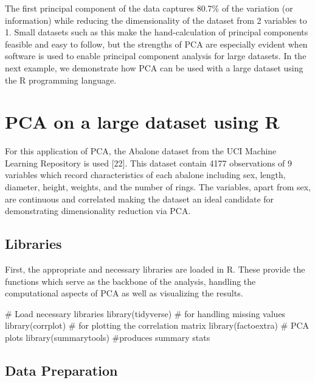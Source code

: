\documentclass[
  letterpaper,
  DIV=11,
  numbers=noendperiod]{scrreprt}
\newenvironment{Shaded}{\begin{snugshade}}{\end{snugshade}}
\newcommand{\CommentTok}[1]{\textcolor[rgb]{0.37,0.37,0.37}{#1}}
\newcommand{\FunctionTok}[1]{\textcolor[rgb]{0.28,0.35,0.67}{#1}}
\newcommand{\NormalTok}[1]{\textcolor[rgb]{0.00,0.23,0.31}{#1}}
\begin{document}
The first principal component of the data captures 80.7\% of the
variation (or information) while reducing the dimensionality of the
dataset from 2 variables to 1. Small datasets such as this make the
hand-calculation of principal components feasible and easy to follow,
but the strengths of PCA are especially evident when software is used to
enable principal component analysis for large datasets. In the next
example, we demonstrate how PCA can be used with a large dataset using
the R programming language.

\hypertarget{pca-on-a-large-dataset-using-r}{%
\section{PCA on a large dataset using
R}\label{pca-on-a-large-dataset-using-r}}

For this application of PCA, the Abalone dataset from the UCI Machine
Learning Repository is used {[}22{]}. This dataset contain 4177
observations of 9 variables which record characteristics of each abalone
including sex, length, diameter, height, weights, and the number of
rings. The variables, apart from sex, are continuous and correlated
making the dataset an ideal candidate for demonstrating dimensionality
reduction via PCA.

\hypertarget{libraries}{%
\subsection{Libraries}\label{libraries}}

First, the appropriate and necessary libraries are loaded in R. These
provide the functions which serve as the backbone of the analysis,
handling the computational aspects of PCA as well as visualizing the
results.

\begin{Shaded}
\begin{Highlighting}[]
\CommentTok{\# Load necessary libraries}
\FunctionTok{library}\NormalTok{(tidyverse)  }\CommentTok{\# for handling missing values}
\FunctionTok{library}\NormalTok{(corrplot) }\CommentTok{\# for plotting the correlation matrix}
\FunctionTok{library}\NormalTok{(factoextra) }\CommentTok{\# PCA plots}
\FunctionTok{library}\NormalTok{(summarytools) }\CommentTok{\#produces summary stats}
\end{Highlighting}
\end{Shaded}

\hypertarget{data-preparation}{%
\subsection{Data Preparation}\label{data-preparation}}
\end{document}
